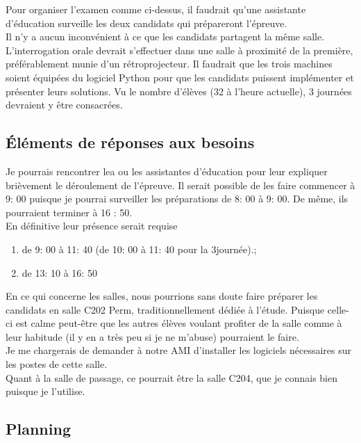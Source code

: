 \documentclass[a4paper,12pt,french]{book}
\begin{document}
Pour organiser l'examen comme ci-dessus, il faudrait qu'un\cdot e assistant\cdot e d'éducation surveille les deux candidats qui prépareront l'épreuve.\\
Il n'y a aucun inconvénient à ce que les candidats partagent la même salle. L'interrogation orale devrait s'effectuer dans une salle à proximité de la première, préférablement munie d'un rétroprojecteur.
Il faudrait que les trois machines soient équipées du logiciel Python pour que les candidats puissent implémenter et présenter leurs solutions.
Vu le nombre d'élèves (32 à l'heure actuelle), 3 journées devraient y être consacrées.

\subsection*{\'Eléments de réponses aux besoins}

Je pourrais rencontrer le\cdot a ou les assistant\cdot e\cdot s d'éducation pour leur expliquer brièvement le déroulement de l'épreuve. Il serait possible de les faire commencer à 9: 00 puisque je pourrai surveiller les préparations de 8: 00 à 9: 00. De même, ils pourraient terminer à 16 : 50.\\
En définitive leur présence serait requise 
\begin{enumerate}[--]
	\item de 9: 00 à 11: 40 (de 10: 00 à 11: 40 pour la 3\eme journée).;
    \item de 13: 10 à 16: 50 \\
\end{enumerate}

En ce qui concerne les salles, nous pourrions sans doute faire préparer les candidats en salle C202 Perm, traditionnellement dédiée à l'étude. Puisque celle-ci est calme peut-être que les autres élèves voulant profiter de la salle comme à leur habitude (il y en a très peu si je ne m'abuse) pourraient le faire.\\
Je me chargerais de demander à notre \textsc{AMI} d'installer les logiciels nécessaires sur les postes de cette salle.\\

Quant à la salle de passage, ce pourrait être la salle C204, que je connais bien puisque je l'utilise.\\

\subsection*{Planning}
\end{document}
